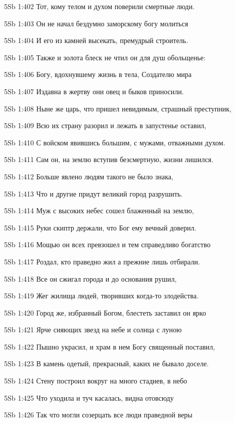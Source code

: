\vs 5Sb 1:402 Тот, кому телом и духом поверили смертные люди.

\vs 5Sb 1:403 Он не начал бездумно заморскому богу молиться 

\vs 5Sb 1:404 И его из камней высекать, премудрый строитель.

\vs 5Sb 1:405 Также и золота блеск не чтил он  для душ обольщенье: 

\vs 5Sb 1:406 Богу, вдохнувшему жизнь в тела, Создателю мира 

\vs 5Sb 1:407 Издавна в жертву они овец и быков приносили. 

\vs 5Sb 1:408 Ныне же царь, что пришел невидимым, страшный преступник, 

\vs 5Sb 1:409 Всю их страну разорил и лежать в запустенье оставил,

\vs 5Sb 1:410 С войском явившись большим, с мужами, отважными духом.

\vs 5Sb 1:411 Сам он, на землю вступив безсмертную, жизни лишился. 

\vs 5Sb 1:412 Больше явлено людям такого не было знака, 

\vs 5Sb 1:413 Что и другие придут великий город разрушить.

\vs 5Sb 1:414 Муж с высоких небес сошел блаженный на землю, 

\vs 5Sb 1:415 Руки скиптр держали, что Бог ему вечный доверил. 

\vs 5Sb 1:416 Мощью он всех превзошел и тем справедливо богатство 

\vs 5Sb 1:417 Роздал, кто праведно жил  а прежние лишь отбирали. 

\vs 5Sb 1:418 Все он сжигал города и до основания рушил,

\vs 5Sb 1:419 Жег жилища людей, творивших когда-то злодейства.

\vs 5Sb 1:420 Город же, избранный Богом, блестеть заставил он ярко  

\vs 5Sb 1:421 Ярче сияющих звезд на небе и солнца с луною  

\vs 5Sb 1:422 Пышно украсил, и храм в нем Богу священный поставил, 

\vs 5Sb 1:423 В камень одетый, прекрасный, каких не бывало доселе. 

\vs 5Sb 1:424 Стену построил вокруг на много стадиев, в небо

\vs 5Sb 1:425 Что уходила и туч касалась, видна отовсюду  

\vs 5Sb 1:426 Так что могли созерцать все люди праведной веры 

